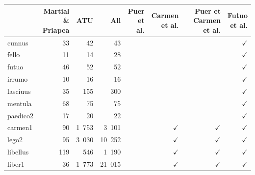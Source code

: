 \begin{table}[p]
    \centering
    \begin{tabular}{l|rrr|rrrr}
    \toprule
    {} &  \makecell{Martial \\ \& Priapea} &  ATU &       All &  \makecell{Puer \\ et al.} &  \makecell{Carmen \\ et al.} &  \makecell{Puer et Carmen \\ et al.} &  \makecell{Futuo \\ et al.} \\
    \midrule
cunnus   &                  33 &              42 &        43 &         &           &                   &                        $\checkmark$ \\
fello    &                  11 &              14 &        28 &         &           &                   &                        $\checkmark$ \\
futuo    &                  46 &              52 &        52 &         &           &                   &                        $\checkmark$ \\
irrumo   &                  10 &              16 &        16 &         &           &                   &                        $\checkmark$ \\
lasciuus &                  35 &             155 &       300 &         &           &                   &                        $\checkmark$ \\
mentula  &                  68 &              75 &        75 &         &           &                   &                        $\checkmark$ \\
paedico2 &                  17 &              20 &        22 &         &           &                   &                        $\checkmark$ \\
carmen1  &                  90 &            1~753 &      3~101 &         &           $\checkmark$ &                   $\checkmark$ &                        $\checkmark$ \\
lego2    &                  95 &            3~030 &     10~252 &         &           $\checkmark$ &                   $\checkmark$ &                        $\checkmark$ \\
libellus &                 119 &             546 &      1~190 &         &           $\checkmark$ &                   $\checkmark$ &                        $\checkmark$ \\
liber1   &                  36 &            1~773 &     21~015 &         &           $\checkmark$ &                   $\checkmark$ &                        $\checkmark$ \\

\end{tabular}
\end{table}
